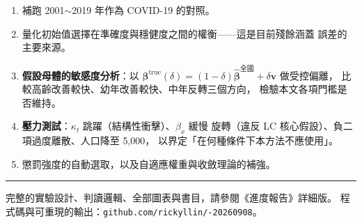 \documentclass[UTF8, fontset=macnew, a4paper, 12pt]{ctexart}
\begin{document}
\begin{enumerate}[leftmargin=*]
  \item 補跑 2001$\sim$2019 年作為 COVID-19 的對照。
  \item 量化初始值選擇在準確度與穩健度之間的權衡——這是目前殘餘涵蓋
        誤差的主要來源。
  \item \textbf{假設母體的敏感度分析}：以
        $\boldsymbol{\beta}^{\text{true}}(\delta)=(1-\delta)
        \hat{\boldsymbol{\beta}}^{\text{全國}}+\delta\mathbf{v}$ 做受控偏離，
        比較高齡改善較快、幼年改善較快、中年反轉三個方向，
        檢驗本文各項門檻是否維持。
  \item \textbf{壓力測試}：$\kappa_t$ 跳躍（結構性衝擊）、$\beta_x$ 緩慢
        旋轉（違反 LC 核心假設）、負二項過度離散、人口降至 5,000，
        以界定「在何種條件下本方法不應使用」。
  \item 懲罰強度的自動選取，以及自適應權重與收斂理論的補強。
\end{enumerate}

\vspace{8pt}
\hrule
\vspace{6pt}
\noindent\small
完整的實驗設計、判讀邏輯、全部圖表與書目，請參閱《進度報告》詳細版。
程式碼與可重現的輸出：\texttt{github.com/rickyllin/-20260908}。
\end{document}
